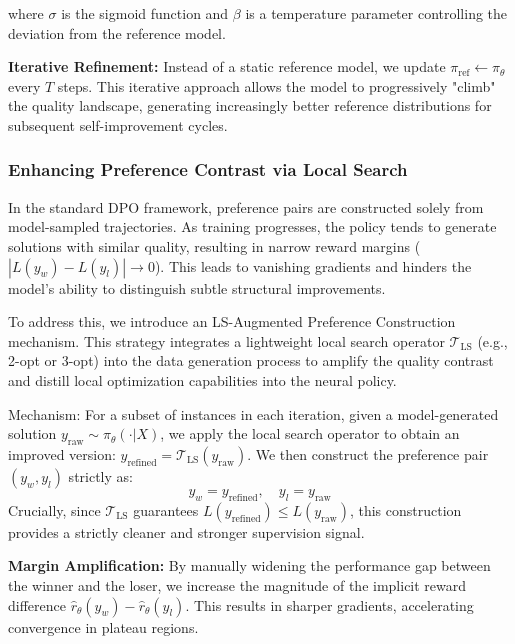 \documentclass{article}
\theoremstyle{plain}
\theoremstyle{definition}
\theoremstyle{remark}
\begin{document}
where $\sigma$ is the sigmoid function and $\beta$ is a temperature parameter controlling the deviation from the reference model.

\textbf{Iterative Refinement:} Instead of a static reference model, we update $\pi_{\text{ref}} \leftarrow \pi_{\theta}$ every $T$ steps. This iterative approach allows the model to progressively "climb" the quality landscape, generating increasingly better reference distributions for subsequent self-improvement cycles.

\subsubsection{Enhancing Preference Contrast via Local Search}

In the standard DPO framework, preference pairs are constructed solely from model-sampled trajectories. As training progresses, the policy tends to generate solutions with similar quality, resulting in narrow reward margins ($|L(y_w) - L(y_l)| \to 0$). This leads to vanishing gradients and hinders the model's ability to distinguish subtle structural improvements.

To address this, we introduce an LS-Augmented Preference Construction mechanism. This strategy integrates a lightweight local search operator $\mathcal{T}_{\text{LS}}$ (e.g., 2-opt or 3-opt) into the data generation process to amplify the quality contrast and distill local optimization capabilities into the neural policy.

Mechanism:
For a subset of instances in each iteration, given a model-generated solution $y_{\text{raw}} \sim \pi_\theta(\cdot|X)$, we apply the local search operator to obtain an improved version: $y_{\text{refined}} = \mathcal{T}_{\text{LS}}(y_{\text{raw}})$. We then construct the preference pair $(y_w, y_l)$ strictly as:
\vspace{-5pt}
\begin{equation}
    y_w = y_{\text{refined}}, \quad y_l = y_{\text{raw}}
\end{equation}
\vspace{-5pt}
Crucially, since $\mathcal{T}_{\text{LS}}$ guarantees $L(y_{\text{refined}}) \le L(y_{\text{raw}})$, this construction provides a strictly cleaner and stronger supervision signal.



\textbf{Margin Amplification:} By manually widening the performance gap between the winner and the loser, we increase the magnitude of the implicit reward difference $\hat{r}_\theta(y_w) - \hat{r}_\theta(y_l)$. This results in sharper gradients, accelerating convergence in plateau regions.
\end{document}
